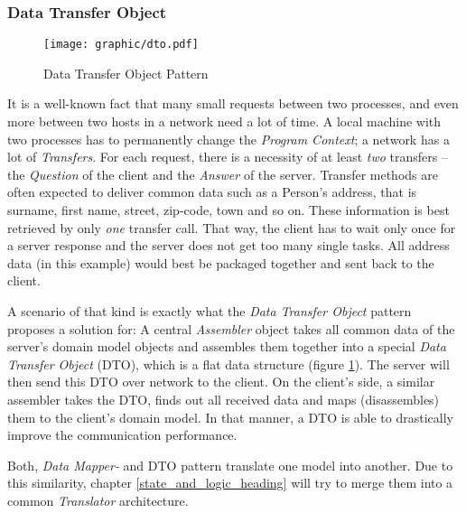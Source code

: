 %
%
%
%
%
%
%

\subsubsection{Data Transfer Object}
\label{data_transfer_object_heading}

\begin{figure}[ht]
    \begin{center}
       \texttt{[image: graphic/dto.pdf]}
       \caption{Data Transfer Object Pattern}
       \label{dto_figure}
    \end{center}
\end{figure}

It is a well-known fact that many small requests between two processes, and
even more between two hosts in a network need a lot of time. A local machine
with two processes has to permanently change the \emph{Program Context}; a
network has a lot of \emph{Transfers}. For each request, there is a necessity
of at least \emph{two} transfers -- the \emph{Question} of the client and the
\emph{Answer} of the server. Transfer methods are often expected to deliver
common data such as a Person's address, that is surname, first name, street,
zip-code, town and so on. These information is best retrieved by only
\emph{one} transfer call. That way, the client has to wait only once for a
server response and the server does not get too many single tasks. All address
data (in this example) would best be packaged together and sent back to the
client.

A scenario of that kind is exactly what the \emph{Data Transfer Object} pattern
\cite{fowler2002} proposes a solution for: A central \emph{Assembler} object
takes all common data of the server's domain model objects and assembles them
together into a special \emph{Data Transfer Object} (DTO), which is a flat data
structure (figure \ref{dto_figure}). The server will then send this DTO over
network to the client. On the client's side, a similar assembler takes the DTO,
finds out all received data and maps (disassembles) them to the client's domain
model. In that manner, a DTO is able to drastically improve the communication
performance.

Both, \emph{Data Mapper-} and DTO pattern translate one model into another. Due
to this similarity, chapter \ref{state_and_logic_heading} will try to merge
them into a common \emph{Translator} architecture.

